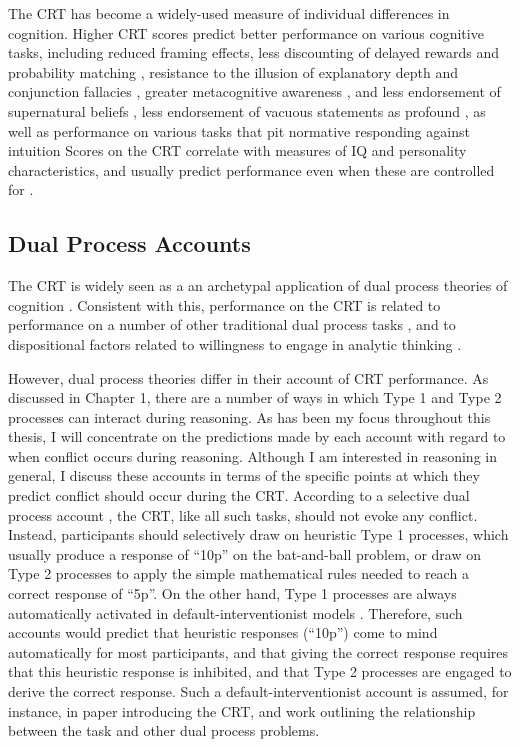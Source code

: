 The CRT has become a widely-used measure of individual differences in cognition.
Higher CRT scores predict better performance on various cognitive tasks,
including reduced framing effects,
less discounting of delayed rewards
\citep{Cokely2009,Frederick2005}
and probability matching \citep{Koehler2009},
resistance to the illusion of explanatory depth \citep{Fernbach2013}
and conjunction fallacies \citep{Oechssler2009},
greater metacognitive awareness \citep{Mata2013a},
and less endorsement of supernatural beliefs
\citep{Pennycook2012,Shenhav2012},
less endorsement of vacuous statements as profound \citep{Pennycook2015b},
as well as performance on various tasks that pit normative responding against intuition
\citep{Toplak2011}
Scores on the CRT correlate with measures of IQ and personality characteristics,
and usually predict performance even when these are controlled for
\citep{Toplak2011}.


\subsection{Dual Process Accounts}

The CRT is widely seen as a an archetypal application of
dual process theories of cognition \citep{Frederick2005,Kahneman2005,DeNeys2013a}.
Consistent with this, performance on the CRT is related to
performance on a number of other traditional dual process tasks \citep{Toplak2011},
and to dispositional factors related to willingness to engage in analytic thinking
\citep{Campitelli2010a,Campitelli2013,Bockenholt2012}.

However, dual process theories differ in their account of CRT performance.
As discussed in Chapter 1, there are a number of ways in which
Type 1 and Type 2 processes can interact during reasoning.
As has been my focus throughout this thesis,
I will concentrate on the predictions made by each account
with regard to when conflict occurs during reasoning.
Although I am interested in reasoning in general,
I discuss these accounts in terms of
the specific points at which they predict
conflict should occur during the CRT.
According to a selective dual process account \citep[e.g.][]{Klaczynski2004},
the CRT, like all such tasks, should not evoke any conflict.
Instead, participants should selectively draw on heuristic Type 1 processes,
which usually produce a response of ``10p'' on the bat-and-ball problem,
or draw on Type 2 processes to apply the simple mathematical rules
needed to reach a correct response of ``5p''.
On the other hand, Type 1 processes are always automatically activated
in default-interventionist models \citep{Evans2006,Kahneman2011,Kahneman2005}.
Therefore, such accounts would predict that
heuristic responses (``10p'') come to mind automatically for most participants,
and that giving the correct response requires that this heuristic response is inhibited,
and that Type 2 processes are engaged to derive the correct response.
Such a default-interventionist account is assumed, for instance,
in  paper introducing the CRT,
and  work outlining the relationship between
the task and other dual process problems.

